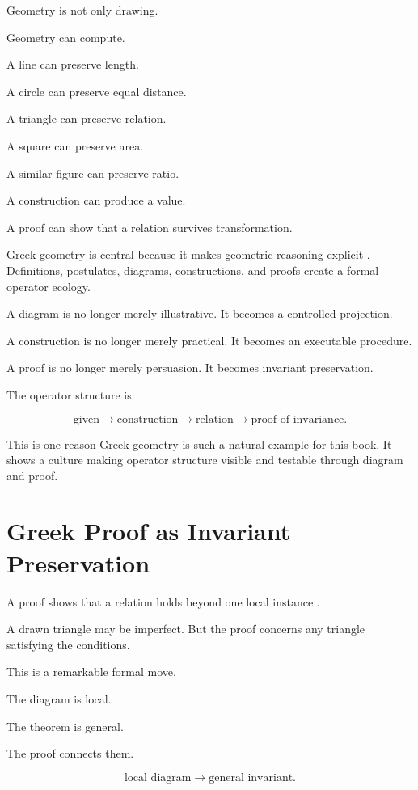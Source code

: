 \documentclass[11pt]{book}
\begin{document}
Geometry is not only drawing.

Geometry can compute.

A line can preserve length.

A circle can preserve equal distance.

A triangle can preserve relation.

A square can preserve area.

A similar figure can preserve ratio.

A construction can produce a value.

A proof can show that a relation survives transformation.

Greek geometry is central because it makes geometric reasoning explicit \cite{EuclidHeath1956Elements,Heath1921GreekMathematics,Netz1999ShapingDeduction}. Definitions, postulates, diagrams, constructions, and proofs create a formal operator ecology.

A diagram is no longer merely illustrative. It becomes a controlled projection.

A construction is no longer merely practical. It becomes an executable procedure.

A proof is no longer merely persuasion. It becomes invariant preservation.

The operator structure is:

\[
\text{given}
\rightarrow
\text{construction}
\rightarrow
\text{relation}
\rightarrow
\text{proof of invariance}.
\]

This is one reason Greek geometry is such a natural example for this book. It shows a culture making operator structure visible and testable through diagram and proof.

\section{Greek Proof as Invariant Preservation}

A proof shows that a relation holds beyond one local instance \cite{EuclidHeath1956Elements,Netz1999ShapingDeduction}.

A drawn triangle may be imperfect. But the proof concerns any triangle satisfying the conditions.

This is a remarkable formal move.

The diagram is local.

The theorem is general.

The proof connects them.

\[
\text{local diagram}
\rightarrow
\text{general invariant}.
\]
\end{document}
